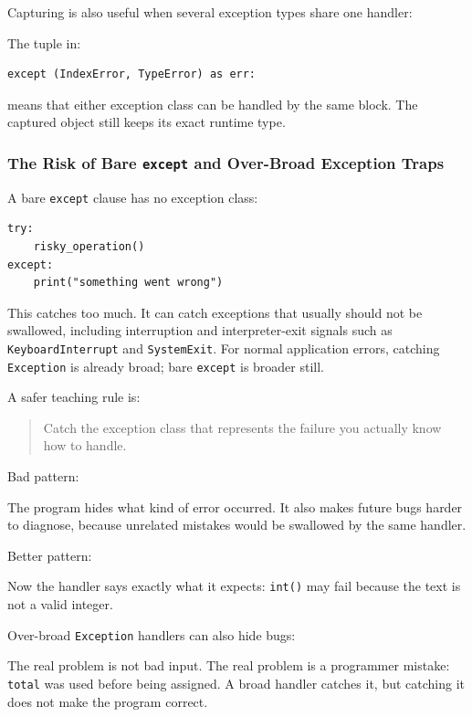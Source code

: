 Capturing is also useful when several exception types share one handler:

The tuple in:

\begin{verbatim}
except (IndexError, TypeError) as err:
\end{verbatim}

means that either exception class can be handled by the same block. The captured object still keeps its exact runtime type.

\subsubsection{The Risk of Bare \texttt{except} and Over-Broad Exception Traps}

A bare \texttt{except} clause has no exception class:

\begin{verbatim}
try:
    risky_operation()
except:
    print("something went wrong")
\end{verbatim}

This catches too much. It can catch exceptions that usually should not be swallowed, including interruption and interpreter-exit signals such as \texttt{KeyboardInterrupt} and \texttt{SystemExit}. For normal application errors, catching \texttt{Exception} is already broad; bare \texttt{except} is broader still.

A safer teaching rule is:

\begin{quote}
Catch the exception class that represents the failure you actually know how to handle.
\end{quote}

Bad pattern:

The program hides what kind of error occurred. It also makes future bugs harder to diagnose, because unrelated mistakes would be swallowed by the same handler.

Better pattern:

Now the handler says exactly what it expects: \texttt{int()} may fail because the text is not a valid integer.

Over-broad \texttt{Exception} handlers can also hide bugs:

The real problem is not bad input. The real problem is a programmer mistake: \texttt{total} was used before being assigned. A broad handler catches it, but catching it does not make the program correct.

